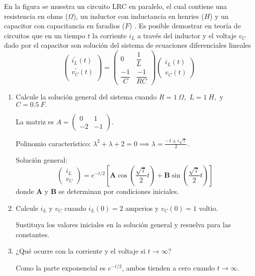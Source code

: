 \begin{prob}
En la figura se muestra un circuito LRC en paralelo, el cual contiene una resistencia en ohms ($\Omega$), un inductor con inductancia en henries ($H$) y un capacitor con capacitancia en faradios ($F$) . Es posible demostrar en teoría de circuitos que en un tiempo $t$ la corriente $i_{L}$ a través del inductor y el voltaje $v_{C}$ dado por el capacitor son solución del sistema de ecuaciones diferenciales lineales
\[ \begin{pmatrix}
i_{L}^{\prime}(t)\\v_{C}^{\prime}(t)\\
\end{pmatrix} =\begin{pmatrix} 0&\dfrac{1}{L} \\ \dfrac{-1}{C} & \dfrac{-1}{RC}
\end{pmatrix} \begin{pmatrix} i_{L} (t)\\v_{C}(t)  \end{pmatrix} \]
\begin{enumerate}[$(a)$]
\item Calcule la solución general del sistema cuando $R=1\ \Omega,$ $L=1\ H,$ y $C=0.5\ F.$
\begin{myproof}
La matriz es $A = \begin{pmatrix} 0 & 1 \\ -2 & -1 \end{pmatrix}$.

Polinomio característico: $\lambda^2 + \lambda + 2 = 0 \implies \lambda = \frac{-1 \pm i\sqrt{7}}{2}$.

Solución general:
\[
\begin{pmatrix} i_L \\ v_C \end{pmatrix} = e^{-t/2} \left[ \mathbf{A} \cos\left(\frac{\sqrt{7}}{2} t\right) + \mathbf{B} \sin\left(\frac{\sqrt{7}}{2} t\right) \right]
\]
donde $\mathbf{A}$ y $\mathbf{B}$ se determinan por condiciones iniciales.
\end{myproof}

\item Calcule $i_{L}$ y $v_{C}$ cuando $i_{L}(0)=2$ amperios y $v_{C}(0)=1$ voltio.
\begin{myproof}
Sustituya los valores iniciales en la solución general y resuelva para las constantes.
\end{myproof}

\item ¿Qué ocurre con la corriente y el voltaje si $t\to \infty$? 
\begin{myproof}
Como la parte exponencial es $e^{-t/2}$, ambos tienden a cero cuando $t\to\infty$.
\end{myproof}
\end{enumerate}
\end{prob}


